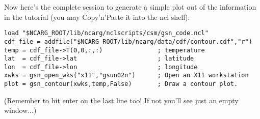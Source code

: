 \documentclass[a4paper,11pt]{ltxdoc}
\begin{document}
Now here's the complete session to generate a simple plot out of the information in the tutorial (you may Copy'n'Paste it into the ncl shell):
\begin{verbatim}
load "$NCARG_ROOT/lib/ncarg/nclscripts/csm/gsn_code.ncl" 
cdf_file = addfile("$NCARG_ROOT/lib/ncarg/data/cdf/contour.cdf","r")
temp = cdf_file->T(0,0,:,:)               ; temperature
lat  = cdf_file->lat                      ; latitude
lon  = cdf_file->lon                      ; longitude
xwks = gsn_open_wks("x11","gsun02n")      ; Open an X11 workstation
plot = gsn_contour(xwks,temp,False)       ; Draw a contour plot.
\end{verbatim}

(Remember to hit enter on the last line too! If not you'll see just an empty window...)\\
\end{document}
